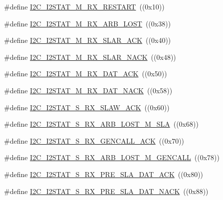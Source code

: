 \begin{DoxyCompactItemize}
\item 
\#define \hyperlink{group___i2_c__18_x_x__43_x_x_gacb1c9145acd64a77464017f1dd9279c5}{I2\+C\+\_\+\+I2\+S\+T\+A\+T\+\_\+\+M\+\_\+\+R\+X\+\_\+\+R\+E\+S\+T\+A\+RT}~((0x10))
\item 
\#define \hyperlink{group___i2_c__18_x_x__43_x_x_gaed32dea40cf84a1efb09e0c389579163}{I2\+C\+\_\+\+I2\+S\+T\+A\+T\+\_\+\+M\+\_\+\+R\+X\+\_\+\+A\+R\+B\+\_\+\+L\+O\+ST}~((0x38))
\item 
\#define \hyperlink{group___i2_c__18_x_x__43_x_x_gacd29e4a94f8a533477dbbf026c0d525a}{I2\+C\+\_\+\+I2\+S\+T\+A\+T\+\_\+\+M\+\_\+\+R\+X\+\_\+\+S\+L\+A\+R\+\_\+\+A\+CK}~((0x40))
\item 
\#define \hyperlink{group___i2_c__18_x_x__43_x_x_gafe156febe3313a9f3423776f97d0f24f}{I2\+C\+\_\+\+I2\+S\+T\+A\+T\+\_\+\+M\+\_\+\+R\+X\+\_\+\+S\+L\+A\+R\+\_\+\+N\+A\+CK}~((0x48))
\item 
\#define \hyperlink{group___i2_c__18_x_x__43_x_x_ga2f07d3cfad351ba3c976d629db20cea2}{I2\+C\+\_\+\+I2\+S\+T\+A\+T\+\_\+\+M\+\_\+\+R\+X\+\_\+\+D\+A\+T\+\_\+\+A\+CK}~((0x50))
\item 
\#define \hyperlink{group___i2_c__18_x_x__43_x_x_ga9cc5203175775bfa5ae6df5d6d98b014}{I2\+C\+\_\+\+I2\+S\+T\+A\+T\+\_\+\+M\+\_\+\+R\+X\+\_\+\+D\+A\+T\+\_\+\+N\+A\+CK}~((0x58))
\item 
\#define \hyperlink{group___i2_c__18_x_x__43_x_x_ga7055c4b55feda352df8016cbca0c270b}{I2\+C\+\_\+\+I2\+S\+T\+A\+T\+\_\+\+S\+\_\+\+R\+X\+\_\+\+S\+L\+A\+W\+\_\+\+A\+CK}~((0x60))
\item 
\#define \hyperlink{group___i2_c__18_x_x__43_x_x_gaf13df6ed7d10be0e063bcbc04d329749}{I2\+C\+\_\+\+I2\+S\+T\+A\+T\+\_\+\+S\+\_\+\+R\+X\+\_\+\+A\+R\+B\+\_\+\+L\+O\+S\+T\+\_\+\+M\+\_\+\+S\+LA}~((0x68))
\item 
\#define \hyperlink{group___i2_c__18_x_x__43_x_x_gadcab34e87ad115c011e23a5bd4fb8aa3}{I2\+C\+\_\+\+I2\+S\+T\+A\+T\+\_\+\+S\+\_\+\+R\+X\+\_\+\+G\+E\+N\+C\+A\+L\+L\+\_\+\+A\+CK}~((0x70))
\item 
\#define \hyperlink{group___i2_c__18_x_x__43_x_x_ga1605c253472e071e7f77e51bda156ba7}{I2\+C\+\_\+\+I2\+S\+T\+A\+T\+\_\+\+S\+\_\+\+R\+X\+\_\+\+A\+R\+B\+\_\+\+L\+O\+S\+T\+\_\+\+M\+\_\+\+G\+E\+N\+C\+A\+LL}~((0x78))
\item 
\#define \hyperlink{group___i2_c__18_x_x__43_x_x_ga4342227592c3e2e345517bd3e6cd8089}{I2\+C\+\_\+\+I2\+S\+T\+A\+T\+\_\+\+S\+\_\+\+R\+X\+\_\+\+P\+R\+E\+\_\+\+S\+L\+A\+\_\+\+D\+A\+T\+\_\+\+A\+CK}~((0x80))
\item 
\#define \hyperlink{group___i2_c__18_x_x__43_x_x_gace56a90d55426cc6ab2a4ca540c63d02}{I2\+C\+\_\+\+I2\+S\+T\+A\+T\+\_\+\+S\+\_\+\+R\+X\+\_\+\+P\+R\+E\+\_\+\+S\+L\+A\+\_\+\+D\+A\+T\+\_\+\+N\+A\+CK}~((0x88))

\end{DoxyCompactItemize}

